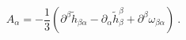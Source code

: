 \begin{equation}
A_{\alpha }=-\frac{1}{3}\left( \partial ^{\beta }\tilde{h}_{\beta \alpha
}-\partial _{\alpha }\tilde{h}_{\beta }^{\beta }+\partial ^{\beta }\omega
_{\beta \alpha }\right) \ .  \label{a}
\end{equation}%
